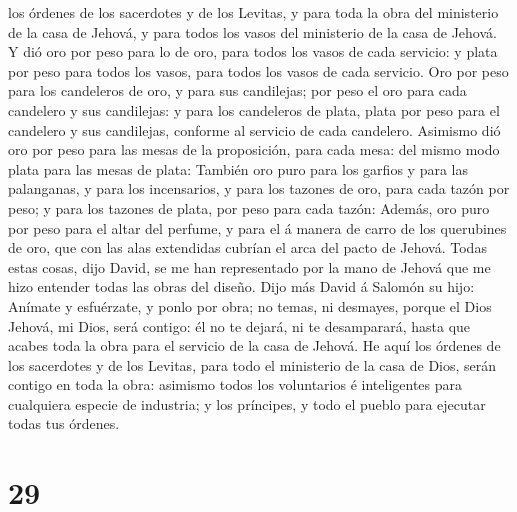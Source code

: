 los órdenes de los sacerdotes y de los Levitas, y para toda la obra del
ministerio de la casa de Jehová, y para todos los vasos del ministerio
de la casa de Jehová.  Y dió oro por peso para lo de oro,
para todos los vasos de cada servicio: y plata por peso para todos los
vasos, para todos los vasos de cada servicio.  Oro por peso
para los candeleros de oro, y para sus candilejas; por peso el oro para
cada candelero y sus candilejas: y para los candeleros de plata, plata
por peso para el candelero y sus candilejas, conforme al servicio de
cada candelero.  Asimismo dió oro por peso para las mesas
de la proposición, para cada mesa: del mismo modo plata para las mesas
de plata:  También oro puro para los garfios y para las
palanganas, y para los incensarios, y para los tazones de oro, para cada
tazón por peso; y para los tazones de plata, por peso para cada tazón:
 Además, oro puro por peso para el altar del perfume, y
para el á manera de carro de los querubines de oro, que con las alas
extendidas cubrían el arca del pacto de Jehová.  Todas
estas cosas, dijo David, se me han representado por la mano de Jehová
que me hizo entender todas las obras del diseño.  Dijo más
David á Salomón su hijo: Anímate y esfuérzate, y ponlo por obra; no
temas, ni desmayes, porque el Dios Jehová, mi Dios, será contigo: él no
te dejará, ni te desamparará, hasta que acabes toda la obra para el
servicio de la casa de Jehová.  He aquí los órdenes de los
sacerdotes y de los Levitas, para todo el ministerio de la casa de Dios,
serán contigo en toda la obra: asimismo todos los voluntarios é
inteligentes para cualquiera especie de industria; y los príncipes, y
todo el pueblo para ejecutar todas tus órdenes.

\hypertarget{section-28}{%
\section{29}\label{section-28}}

